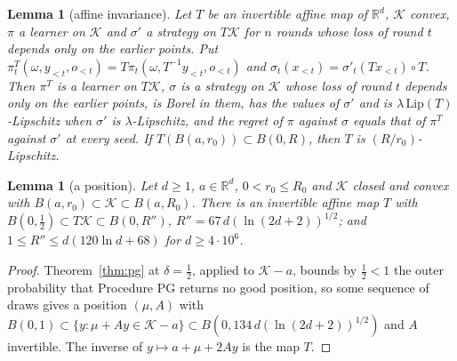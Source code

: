 \documentclass[11pt]{amsart}
\newtheorem{lemma}[theorem]{Lemma}
\theoremstyle{definition}
\numberwithin{equation}{section}
\newcommand{\R}{\mathbb{R}}
\newcommand{\cK}{\mathcal{K}}
\begin{document}
\begin{lemma}[affine invariance]\label{lem:aff}
Let $T$ be an invertible affine map of $\R^d$, $\cK$ convex, $\pi$ a learner on $\cK$ and $\sigma'$ a strategy on $T\cK$ for $n$ rounds whose loss of round $t$ depends only on the earlier points. Put $\pi^T_t(\omega,y_{<t},o_{<t})=T\pi_t(\omega,T^{-1}y_{<t},o_{<t})$ and $\sigma_t(x_{<t})=\sigma'_t(Tx_{<t})\circ T$. Then $\pi^T$ is a learner on $T\cK$, $\sigma$ is a strategy on $\cK$ whose loss of round $t$ depends only on the earlier points, is Borel in them, has the values of $\sigma'$ and is $\lambda\,\mathrm{Lip}(T)$-Lipschitz when $\sigma'$ is $\lambda$-Lipschitz, and the regret of $\pi$ against $\sigma$ equals that of $\pi^T$ against $\sigma'$ at every seed. If $T(B(a,r_0))\subset B(0,R)$, then $T$ is $(R/r_0)$-Lipschitz.
\end{lemma}

\begin{lemma}[a position]\label{lem:pos}
Let $d\ge1$, $a\in\R^d$, $0<r_0\le R_0$ and $\cK$ closed and convex with $B(a,r_0)\subset\cK\subset B(a,R_0)$. There is an invertible affine map $T$ with $B(0,\frac12)\subset T\cK\subset B(0,R'')$, $R''=67\,d(\ln(2d+2))^{1/2}$; and $1\le R''\le d(120\ln d+68)$ for $d\ge4\cdot10^6$.
\end{lemma}

\begin{proof}
Theorem~\ref{thm:pg} at $\delta=\frac12$, applied to $\cK-a$, bounds by $\frac12<1$ the outer probability that Procedure PG returns no good position, so some sequence of draws gives a position $(\mu,A)$ with $B(0,1)\subset\{y:\mu+Ay\in\cK-a\}\subset B(0,134\,d(\ln(2d+2))^{1/2})$ and $A$ invertible. The inverse of $y\mapsto a+\mu+2Ay$ is the map $T$.
\end{proof}
\end{document}
